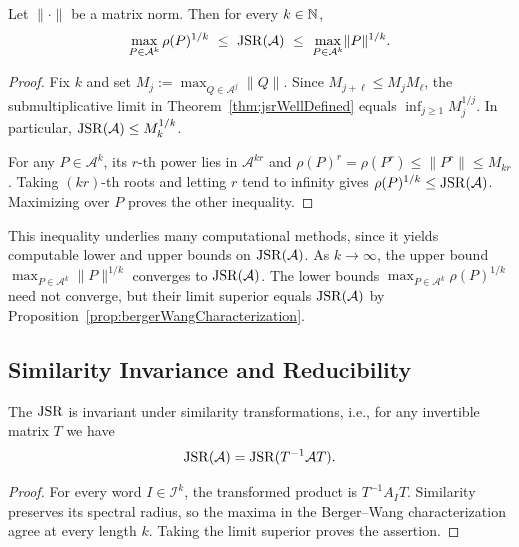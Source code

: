 \begin{proposition}\citep{RotaStrang1960NoteJSR,Jungers2009JointSpectralRadius}\label{prop:threeMemberInequality}
    Let $\lVert \cdot\rVert $ be a matrix norm.
    Then for every $k\in\mathbb{N}$,
    \begin{equation}\label{eq:three_member}
        \max_{P\in\mathcal{A}^k}\rho(P)^{1/k}\ \leq\ \JSR(\mathcal{A})\ \leq\ \max_{P\in\mathcal{A}^k}\lVert P\rVert ^{1/k}.
    \end{equation}
\end{proposition}

\begin{proof}
    Fix $k$ and set $M_j:=\max_{Q\in\mathcal{A}^j}\lVert Q\rVert$.
    Since $M_{j+\ell}\leq M_jM_\ell$, the submultiplicative limit in Theorem~\ref{thm:jsrWellDefined} equals $\inf_{j\geq1}M_j^{1/j}$.
    In particular, $\operatorname{JSR}(\mathcal{A})\leq M_k^{1/k}$.

    For any $P\in\mathcal{A}^k$, its $r$-th power lies in $\mathcal{A}^{kr}$ and $\rho(P)^r=\rho(P^r)\leq\lVert P^r\rVert\leq M_{kr}$.
    Taking $(kr)$-th roots and letting $r$ tend to infinity gives $\rho(P)^{1/k}\leq\operatorname{JSR}(\mathcal{A})$.
    Maximizing over $P$ proves the other inequality.
\end{proof}

This inequality underlies many computational methods, since it yields computable lower and upper bounds on $\operatorname{JSR}(\mathcal{A})$.
As $k\to\infty$, the upper bound $\max_{P\in\mathcal{A}^k}\lVert P\rVert ^{1/k}$ converges to $\operatorname{JSR}(\mathcal{A})$.
The lower bounds $\max_{P\in\mathcal{A}^k}\rho(P)^{1/k}$ need not converge, but their limit superior equals $\operatorname{JSR}(\mathcal{A})$ by Proposition~\ref{prop:bergerWangCharacterization}.

\subsection*{Similarity Invariance and Reducibility}

\begin{proposition}\citep{Jungers2009JointSpectralRadius}
    \label{prop:jsrSimilarityInvariance}
    The $\operatorname{JSR}$ is invariant under similarity transformations, i.e., for any invertible matrix $T$ we have
    \begin{equation}
        \operatorname{JSR}(\mathcal{A}) = \operatorname{JSR}(T^{-1}\mathcal{A}T).
    \end{equation}
\end{proposition}

\begin{proof}
    For every word $I\in\mathcal{I}^k$, the transformed product is $T^{-1}A_IT$.
    Similarity preserves its spectral radius, so the maxima in the Berger--Wang characterization agree at every length $k$.
    Taking the limit superior proves the assertion.
\end{proof}

